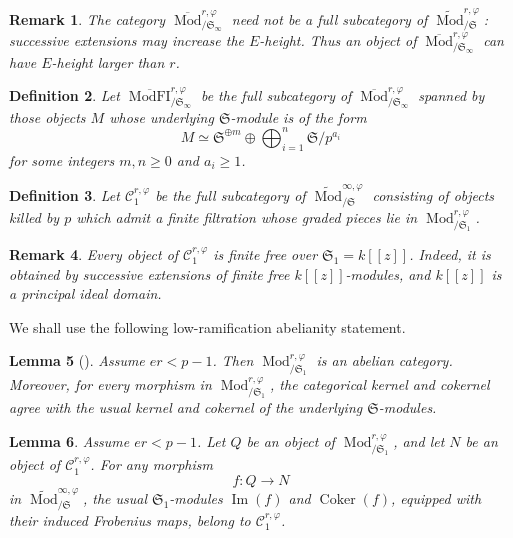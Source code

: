 \documentclass[11pt]{amsart}
\newtheorem{lemma}{Lemma}[section]
\newtheorem{definition}[lemma]{Definition}
\newtheorem{remark}[lemma]{Remark}
\numberwithin{equation}{section}
\newcommand{\ModFI}{\operatorname{ModFI}}
\newcommand{\mf}{\mathfrak}
\newcommand{\Mod}{\operatorname{Mod}}
\newcommand{\im}{\operatorname{Im}}
\newcommand{\Coker}{\operatorname{Coker}}
\newcommand{\mS}{\mf{S}}
\numberwithin{equation}{section}
\begin{document}
\begin{remark}
The category $\overline{\Mod}^{r,\varphi}_{/\mS_\infty}$ need not be a full
subcategory of $\widetilde{\Mod}^{r,\varphi}_{/\mS}$: successive extensions may
increase the $E$-height.  Thus an object of
$\overline{\Mod}^{r,\varphi}_{/\mS_\infty}$ can have $E$-height larger than
$r$.
\end{remark}

\begin{definition}
Let $\overline{\ModFI}^{r,\varphi}_{/\mS_\infty}$ be the full subcategory of
$\overline{\Mod}^{r,\varphi}_{/\mS_\infty}$ spanned by those objects $M$
whose underlying $\mS$-module is of the form
\[
  M\simeq
  \mS^{\oplus m}
  \oplus
  \bigoplus_{i=1}^n \mS/p^{a_i}
\]
for some integers $m,n\geq 0$ and $a_i\geq 1$.
\end{definition}

\begin{definition}
Let $\mathcal C_1^{r,\varphi}$ be the full subcategory of
$\widetilde{\Mod}^{\infty,\varphi}_{/\mS}$ consisting of objects killed by $p$ which
admit a finite filtration whose graded pieces lie in
$\Mod^{r,\varphi}_{/\mS_1}$.
\end{definition}

\begin{remark}
Every object of $\mathcal C_1^{r,\varphi}$ is finite free over
$\mS_1=k[[z]]$.  Indeed, it is obtained by successive extensions of finite
free $k[[z]]$-modules, and $k[[z]]$ is a principal ideal domain.
\end{remark}

We shall use the following low-ramification abelianity statement.

\begin{lemma}[{\cite[Corollary~6.15]{M21}}]\label{bkoneab}
Assume $er<p-1$.  Then $\Mod^{r,\varphi}_{/\mS_1}$ is an abelian category.
Moreover, for every morphism in $\Mod^{r,\varphi}_{/\mS_1}$, the
categorical kernel and cokernel agree with the usual kernel and cokernel of
the underlying $\mS$-modules.
\end{lemma}

\begin{lemma}\label{cokcone}
Assume $er<p-1$.  Let $Q$ be an object of
$\Mod^{r,\varphi}_{/\mS_1}$, and let $N$ be an object of
$\mathcal C_1^{r,\varphi}$.  For any morphism
\[
  f:Q\longrightarrow N
\]
in $\widetilde{\Mod}^{\infty,\varphi}_{/\mS}$, the usual $\mS_1$-modules
$\im(f)$ and $\Coker(f)$, equipped with their induced Frobenius maps, belong
to $\mathcal C_1^{r,\varphi}$.
\end{lemma}
\end{document}
